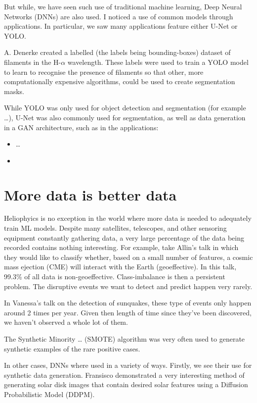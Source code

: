 \documentclass[11pt]{article}
\begin{document}
But while, we have seen such use of traditional machine learning, Deep
Neural Networks (DNNs) are also used. I noticed a use of common models
through applications. In particular, we saw many applications feature
either U-Net or YOLO.

A. Denerke created a labelled (the labels being bounding-boxes)
dataset of filaments in the H-\(\alpha\) wavelength. These labels were
used to train a YOLO model to learn to recognise the presence of
filaments so that other, more computationally expensive algorithms,
could be used to create segmentation masks.

While YOLO was only used for object detection and segmentation (for
example \ldots{}), U-Net was also commonly used for segmentation, as well
as data generation in a GAN architecture, such as in the applications:

\begin{itemize}
\item \ldots{}
\item 
\end{itemize}

\section{More data is better data}
\label{sec:org6099f27}

Heliophyics is no exception in the world where more data is needed to
adequately train ML models. Despite many satellites, telescopes, and
other sensoring equipment constantly gathering data, a very large
percentage of the data being recorded contains nothing
interesting. For example, take Allin's talk in which they would like
to classify whether, based on a small number of features, a cosmic
mass ejection (CME) will interact with the Earth (geoeffective). In
this talk, 99.3\% of all data is non-geoeffective. Class-imbalance is
then a persistent problem. The disruptive events we want to detect and
predict happen very rarely.

In Vanessa's talk on the detection of sunquakes, these type of events
only happen around 2 times per year. Given then length of time since
they've been discovered, we haven't observed a whole lot of them.

The Synthetic Minority \ldots{} (SMOTE) algorithm was very often used to
generate synthetic examples of the rare positive cases.

In other cases, DNNs where used in a variety of ways. Firstly, we see
their use for synthetic data generation. Fransisco demonstrated a very
interesting method of generating solar disk images that contain
desired solar features using a Diffusion Probabilistic Model (DDPM).
\end{document}
